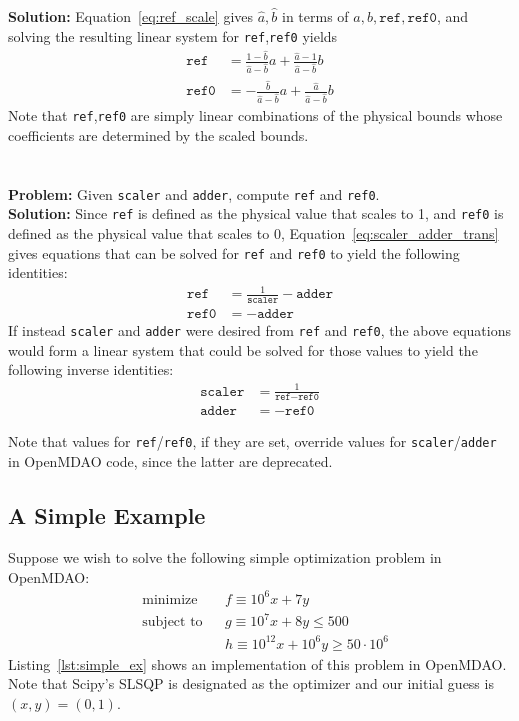 \documentclass{article}
\begin{document}
\noindent
\textbf{Solution:} Equation~\eqref{eq:ref_scale} gives $\hat{a},\hat{b}$ in terms of $a,b,\texttt{ref},\texttt{ref0}$, and solving the resulting linear system for \texttt{ref},\texttt{ref0} yields
\begin{align*}
    \texttt{ref} &= \frac{1-\hat{b}}{\hat{a}-\hat{b}}a + \frac{\hat{a}-1}{\hat{a}-\hat{b}}b \\
    \texttt{ref0} &= -\frac{\hat{b}}{\hat{a}-\hat{b}}a + \frac{\hat{a}}{\hat{a}-\hat{b}}b
\end{align*}
Note that \texttt{ref},\texttt{ref0} are simply linear combinations of the physical bounds whose coefficients are determined by the scaled bounds. \\
\\ \\
\noindent
\textbf{Problem:} Given \texttt{scaler} and \texttt{adder}, compute \texttt{ref} and \texttt{ref0}. \\

\noindent
\textbf{Solution:} Since \texttt{ref} is defined as the physical value that scales to 1, and \texttt{ref0} is defined as the physical value that scales to 0, Equation~\eqref{eq:scaler_adder_trans} gives equations that can be solved for \texttt{ref} and \texttt{ref0} to yield the following identities:
\begin{align*}
    \texttt{ref} &= \frac{1}{\texttt{scaler}} - \texttt{adder} \\
    \texttt{ref0} &= -\texttt{adder}
\end{align*}
If instead \texttt{scaler} and \texttt{adder} were desired from \texttt{ref} and \texttt{ref0}, the above equations would form a linear system that could be solved for those values to yield the following inverse identities:
\begin{align*}
    \texttt{scaler} &= \frac{1}{\texttt{ref} - \texttt{ref0}} \\
    \texttt{adder} &= -\texttt{ref0}
\end{align*}

\noindent
Note that values for \texttt{ref}/\texttt{ref0}, if they are set, override values for \texttt{scaler}/\texttt{adder} in OpenMDAO code, since the latter are deprecated.

\subsection*{A Simple Example}

Suppose we wish to solve the following simple optimization problem in OpenMDAO:
\begin{equation*}
\begin{aligned}
& \text{minimize} & & f \equiv 10^6 x + 7 y \\
& \text{subject to} & & g \equiv 10^7 x + 8 y \leq 500 \\
& & & h \equiv 10^{12} x + 10^6 y \geq 50 \cdot 10^6
\end{aligned}
\end{equation*}
Listing~\ref{lst:simple_ex} shows an implementation of this problem in OpenMDAO. Note that Scipy's SLSQP is designated as the optimizer and our initial guess is $(x,y) = (0,1)$.
\end{document}
